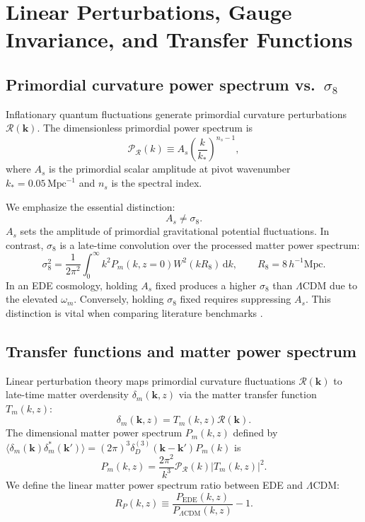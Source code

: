 \documentclass[11pt]{article}
\newcommand{\dd}{\,\mathrm d}
\newcommand{\Mpc}{\mathrm{Mpc}}
\newcommand{\LCDM}{\Lambda\mathrm{CDM}}
\begin{document}
\section{Linear Perturbations, Gauge Invariance, and Transfer Functions}
\label{sec:perturbations}

\subsection{Primordial curvature power spectrum vs.\ \texorpdfstring{$\sigma_8$}{sigma8}}
Inflationary quantum fluctuations generate primordial curvature perturbations $\mathcal R(\bm k)$. The dimensionless primordial power spectrum is
\begin{equation}
\boxed{\mathcal P_{\mathcal R}(k) \equiv A_s \left( \frac{k}{k_*} \right)^{n_s - 1}},
\end{equation}
where $A_s$ is the primordial scalar amplitude at pivot wavenumber $k_* = 0.05\,\Mpc^{-1}$ and $n_s$ is the spectral index. 

We emphasize the essential distinction:
\begin{equation}
\boxed{A_s \neq \sigma_8}.
\end{equation}
$A_s$ sets the amplitude of primordial gravitational potential fluctuations. In contrast, $\sigma_8$ is a late-time convolution over the processed matter power spectrum:
\begin{equation}
\sigma_8^2 = \frac{1}{2\pi^2}\int_0^\infty k^2 P_m(k, z=0) W^2(k R_8)\dd k, \qquad R_8 = 8\,h^{-1}\Mpc.
\end{equation}
In an EDE cosmology, holding $A_s$ fixed produces a higher $\sigma_8$ than $\Lambda\mathrm{CDM}$ due to the elevated $\omega_m$. Conversely, holding $\sigma_8$ fixed requires suppressing $A_s$. This distinction is vital when comparing literature benchmarks \cite{klypin2021ede}.

\subsection{Transfer functions and matter power spectrum}
Linear perturbation theory maps primordial curvature fluctuations $\mathcal R(\bm k)$ to late-time matter overdensity $\delta_m(\bm k, z)$ via the matter transfer function $T_m(k, z)$:
\begin{equation}
\delta_m(\bm k, z) = T_m(k, z) \mathcal R(\bm k).
\end{equation}
The dimensional matter power spectrum $P_m(k,z)$ defined by $\langle \delta_m(\bm k)\delta_m^*(\bm k')\rangle = (2\pi)^3\delta_D^{(3)}(\bm k - \bm k')P_m(k)$ is
\begin{equation}
\boxed{P_m(k, z) = \frac{2\pi^2}{k^3} \mathcal P_{\mathcal R}(k) |T_m(k, z)|^2}.
\end{equation}
We define the linear matter power spectrum ratio between EDE and $\Lambda\mathrm{CDM}$:
\begin{equation}
\boxed{R_P(k,z) \equiv \frac{P_{\mathrm{EDE}}(k,z)}{P_{\LCDM}(k,z)} - 1}.
\end{equation}
\end{document}
